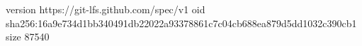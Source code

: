 version https://git-lfs.github.com/spec/v1
oid sha256:16a9e734d1bb340491db22022a93378861c7c04cb688ea879d5dd1032c390cb1
size 87540
